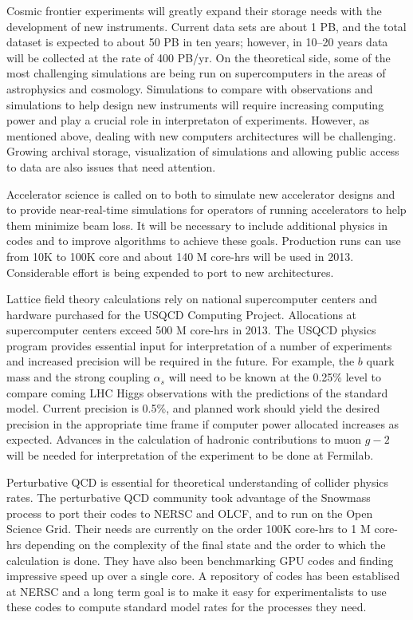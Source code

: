 
Cosmic frontier experiments will greatly expand their storage needs with the
development of new instruments.  Current data sets are about 1 PB, and the
total dataset is expected to about 50 PB in ten years; however, in
10--20 years data will be collected at the rate of 400 PB/yr.
On the theoretical side, some of the most challenging simulations are
being run on supercomputers in the areas of astrophysics and cosmology.
Simulations to compare with observations and simulations to help design
new instruments will require increasing computing power and play a crucial
role in interpretaton of experiments.  However,
as mentioned above, dealing with new computers architectures
will be challenging.  Growing archival storage, visualization of
simulations and allowing public access
to data are also issues that need attention.

Accelerator science is called on to both to simulate new accelerator designs
and to provide near-real-time simulations for operators of running accelerators to 
help them minimize beam loss.
It will be necessary to include additional physics in codes and
to improve algorithms to achieve these goals.  
Production runs can use from 10K to 100K core and about 140 M core-hrs 
will be used in 2013.  Considerable effort is being expended to 
port to new architectures.

Lattice field theory calculations rely on national supercomputer
centers and hardware purchased for the USQCD Computing Project.
Allocations at supercomputer centers exceed 500 M core-hrs in 2013.
The USQCD physics program provides essential input for interpretation
of a number of experiments and increased precision will be
required in the future.  For example, the $b$ quark mass and the
strong coupling $\alpha_s$ will need to be known at the
0.25\% level to compare coming LHC Higgs observations with the
predictions of the standard model.  Current precision is 0.5\%, and
planned work should yield the desired precision in the
appropriate time frame if computer power allocated increases as expected.
Advances in the calculation of hadronic contributions to muon $g-2$ will
be needed for interpretation of the experiment to be done at Fermilab.

Perturbative QCD is essential for theoretical understanding of collider
physics rates.
The perturbative QCD community took advantage of the Snowmass process to
port their codes to NERSC and OLCF, and to run on the Open Science Grid.  
Their needs are currently on the order 100K core-hrs to 1 M core-hrs
depending on the complexity of the final state and the order to
which the calculation is done.  They have also been benchmarking
GPU codes and finding impressive speed up over a single core.  A repository
of codes has been establised at NERSC and a long term goal is to
make it easy for experimentalists to use these codes to compute
standard model rates for the processes they need.

